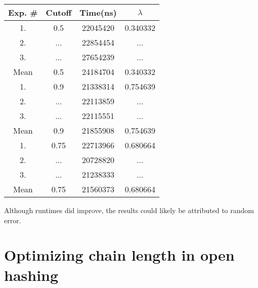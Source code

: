 \documentclass[12pt]{article}
\begin{document}
\begin{center}
\begin{tabular}{|c|c|c|c|}
\hline
Exp. \# & Cutoff & Time(ns) & $\lambda$ \\
\hline
1. & 0.5 & 22045420 & 0.340332 \\
2. & ... & 22854454 & ... \\
3. & ... & 27654239 & ... \\
Mean & 0.5 & 24184704 & 0.340332 \\
\hline
1. & 0.9 & 21338314 & 0.754639 \\
2. & ... & 22113859 & ... \\
3. & ... & 22115551 & ... \\
Mean & 0.9 & 21855908 & 0.754639 \\
\hline
1. & 0.75 & 22713966 & 0.680664 \\
2. & ... & 20728820 & ... \\
3. & ... & 21238333 & ... \\
Mean & 0.75 & 21560373 & 0.680664 \\
\hline
\end{tabular}
\end{center}
Although runtimes did improve, the results could likely be attributed to random error.

\section {Optimizing chain length in open hashing}
\end{document}

